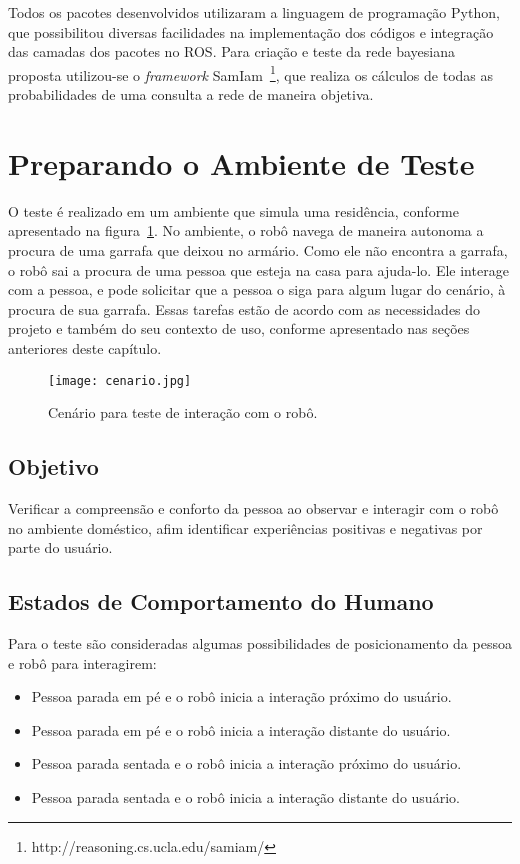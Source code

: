 Todos os pacotes desenvolvidos utilizaram a linguagem de programação Python, que possibilitou diversas facilidades na implementação dos códigos e integração das camadas dos pacotes no ROS. Para criação e teste da rede bayesiana proposta utilizou-se o \emph{framework} SamIam~\footnote{http://reasoning.cs.ucla.edu/samiam/}, que realiza os cálculos de todas as probabilidades de uma consulta a rede de maneira objetiva.

\section{Preparando o Ambiente de Teste}
\label{sec:ambienteteste}
O teste é realizado em um ambiente que simula uma residência, conforme apresentado na figura~\ref{fig:cenario}. No ambiente, o robô navega de maneira autonoma a procura de uma garrafa que deixou no armário. Como ele não encontra a garrafa, o robô sai a procura de uma pessoa que esteja na casa para ajuda-lo. Ele interage com a pessoa, e pode solicitar que a pessoa o siga para algum lugar do cenário, à procura de sua garrafa. Essas tarefas estão de acordo com as necessidades do projeto e também do seu contexto de uso, conforme apresentado nas seções anteriores deste capítulo.

\begin{figure}[ht!]
	\centering
	\begin{minipage}{\textwidth}
		\caption{Cenário para teste de interação com o robô.}
		\texttt{[image: cenario.jpg]}
		\label{fig:cenario}
	\end{minipage}
\end{figure}

\subsection{Objetivo}

Verificar a compreensão e conforto da pessoa ao observar e interagir com o robô no ambiente doméstico, afim identificar experiências positivas e negativas por parte do usuário.

\subsection{Estados de Comportamento do Humano}

Para o teste são consideradas algumas possibilidades de posicionamento da pessoa e robô para interagirem:

\begin{itemize}
	\item Pessoa parada em pé e o robô inicia a interação próximo do usuário.
	\item Pessoa parada em pé e o robô inicia a interação distante do usuário.
	\item Pessoa parada sentada e o robô inicia a interação próximo do usuário.
	\item Pessoa parada sentada e o robô inicia a interação distante do usuário.
\end{itemize}

